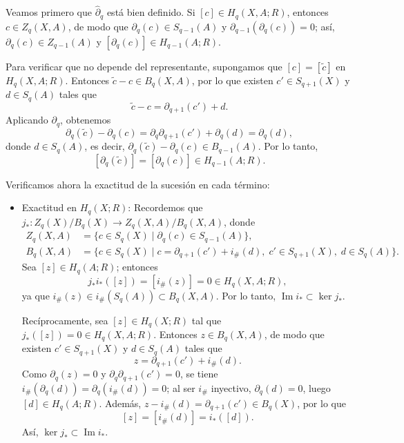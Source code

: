 \begin{dem}
Veamos primero que $\hat{\partial}_q$ está bien definido. Si $[c] \in H_q(X, A; R)$, entonces $c \in Z_q(X, A)$, de modo que $\partial_q(c) \in S_{q-1}(A)$ y $\partial_{q-1}(\partial_q(c)) = 0$; así, $\partial_q(c) \in Z_{q-1}(A)$ y $[\partial_q(c)] \in H_{q-1}(A; R)$.

Para verificar que no depende del representante, supongamos que $[c] = [\tilde{c}]$ en $H_q(X, A; R)$. Entonces $\tilde{c} - c \in B_q(X, A)$, por lo que existen $c' \in S_{q+1}(X)$ y $d \in S_q(A)$ tales que
\[
\tilde{c} - c = \partial_{q+1}(c') + d.
\]
Aplicando $\partial_q$, obtenemos
\[
\partial_q(\tilde{c}) - \partial_q(c) = \partial_q \partial_{q+1}(c') + \partial_q(d) = \partial_q(d),
\]
donde $d \in S_q(A)$, es decir, $\partial_q(\tilde{c}) - \partial_q(c) \in B_{q-1}(A)$. Por lo tanto,
\[
[\partial_q(\tilde{c})] = [\partial_q(c)] \in H_{q-1}(A; R).
\]




Verificamos ahora la exactitud de la sucesión en cada término:

\begin{itemize}
    \item {Exactitud en $H_q(X; R)$:} Recordemos que $j_* \colon Z_q(X)/B_q(X) \to Z_q(X, A)/B_q(X, A)$, donde
    \begin{align*}
    Z_q(X, A) &= \{ c \in S_q(X) \mid \partial_q(c) \in S_{q-1}(A) \}, \\
    B_q(X, A) &= \{ c \in S_q(X) \mid c = \partial_{q+1}(c') + i_\#(d), \; c' \in S_{q+1}(X), \; d \in S_q(A) \}.
    \end{align*}
    Sea $[z] \in H_q(A; R)$; entonces
    \[
    j_* i_*([z]) = [i_\#(z)] = 0 \in H_q(X, A; R),
    \]
    ya que $i_\#(z) \in i_\#(S_q(A)) \subset B_q(X, A)$. Por lo tanto, $\operatorname{Im} i_* \subset \ker j_*$.

    Recíprocamente, sea $[z] \in H_q(X; R)$ tal que $j_*([z]) = 0 \in H_q(X, A; R)$. Entonces $z \in B_q(X, A)$, de modo que existen $c' \in S_{q+1}(X)$ y $d \in S_q(A)$ tales que
    \[
    z = \partial_{q+1}(c') + i_\#(d).
    \]
    Como $\partial_q(z) = 0$ y $\partial_q \partial_{q+1}(c') = 0$, se tiene $i_\#(\partial_q(d)) = \partial_q(i_\#(d)) = 0$; al ser $i_\#$ inyectivo, $\partial_q(d) = 0$, luego $[d] \in H_q(A; R)$. Además, $z - i_\#(d) = \partial_{q+1}(c') \in B_q(X)$, por lo que
    \[
    [z] = [i_\#(d)] = i_*([d]).
    \]
    Así, $\ker j_* \subset \operatorname{Im} i_*$.


\end{itemize}
\end{dem}
